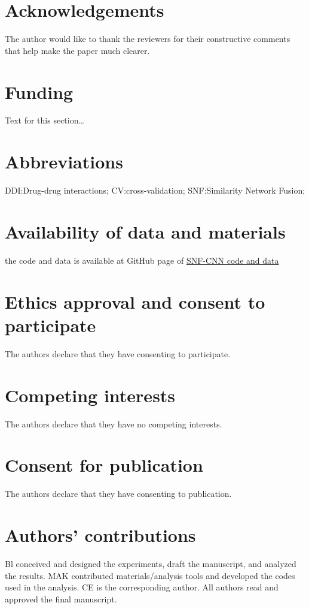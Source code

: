 \documentclass{bmcart}
\begin{document}
\begin{backmatter}

\section*{Acknowledgements}%
The author would like to thank the reviewers for their constructive comments that help make the paper much clearer.

\section*{Funding}%
Text for this section\ldots

\section*{Abbreviations}%
DDI:Drug-drug interactions; CV:cross-validation; SNF:Similarity Network Fusion; 

\section*{Availability of data and materials}%
the code and data is available at GitHub page of \href{https://github.com/aminkhod/DDI-Project/tree/master/CNN\%20model\%20to\%20Recommend\%20Comperhancive\%20DDIs}{SNF-CNN code and data}


\section*{Ethics approval and consent to participate}%
The authors declare that they have consenting to participate.

\section*{Competing interests}
The authors declare that they have no competing interests.

\section*{Consent for publication}%
The authors declare that they have consenting to publication.

\section*{Authors' contributions}
Bl conceived and designed the experiments, draft the manuscript, and analyzed the results. MAK contributed materials/analysis tools and developed the codes used in the analysis. CE is the corresponding author. All authors read and approved the final manuscript.


\end{backmatter}
\end{document}
